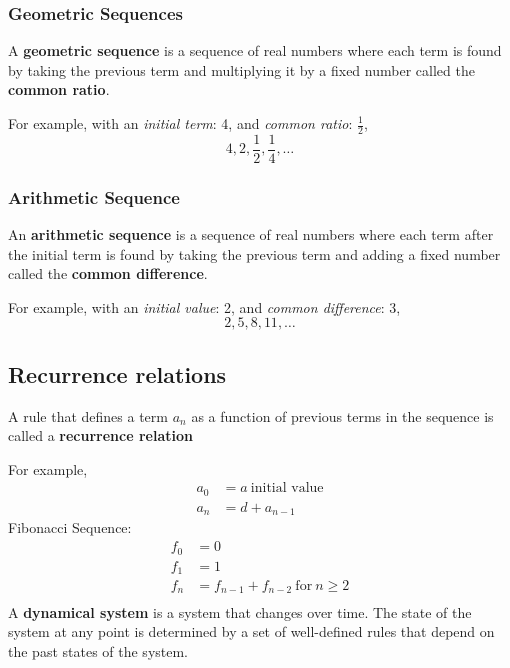 \subsubsection*{Geometric Sequences}
A \textbf{geometric sequence} is a sequence of real numbers where each term is found by taking
the previous term and multiplying it by a fixed number called the \textbf{common ratio}.

For example, with an \textit{initial term}: 4, and \textit{common ratio}: $\frac{1}{2}$,
\[
  4,2,\frac{1}{2},\frac{1}{4}, \ldots
\]
\subsubsection*{Arithmetic Sequence}
An \textbf{arithmetic sequence} is a sequence of real numbers where each term after the initial
term is found by taking the previous term and adding a fixed number called the \textbf{common difference}.

For example, with an \textit{initial value}: 2, and \textit{common difference}: 3,
\[
  2,5,8,11, \ldots
\]

\subsection{Recurrence relations}
A rule that defines a term $a_n$ as a function of previous terms in the sequence is called a
\textbf{recurrence relation}

For example,
\begin{align*}
  a_0 & = a~\text{initial value} \\
  a_n & = d + a_{n-1}
\end{align*}
Fibonacci Sequence:
\begin{align*}
  f_0 & = 0                                     \\
  f_1 & = 1                                     \\
  f_n & = f_{n-1} + f_{n-2}~\text{for}~n \geq 2 \\
\end{align*}
A \textbf{dynamical system} is a system that changes over time. The state of the system
at any point is determined by a set of well-defined rules that depend on the past states
of the system.

